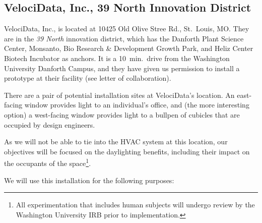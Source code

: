 \subsection{VelociData, Inc., 39 North Innovation District}

VelociData, Inc., is located at 10425 Old Olive Stree Rd., St.~Louis, MO.
They are in the \emph{39 North}
innovation district, which has the Danforth
Plant Science Center, Monsanto, Bio Research \& Development Growth Park,
and Heliz Center Biotech Incubator as anchors. It is a 10~min.~drive from
the Washington University Danforth Campus, and they have given us
permission to install a prototype at their facility (see letter
of collaboration).

There are a pair of potential installation sites at VelociData's location.
An east-facing window provides light to an individual's office, and
(the more interesting option) a west-facing window provides light to
a bullpen of cubicles that are occupied by design engineers.

As we will not be able to tie into the HVAC system at this location, our
objectives will be focused on the daylighting benefits, including their
impact on the occupants of the space\footnote{All experimentation that
includes human subjects will undergo review by the Washington University
IRB prior to implementation.}.

We will use this installation for the following purposes:

